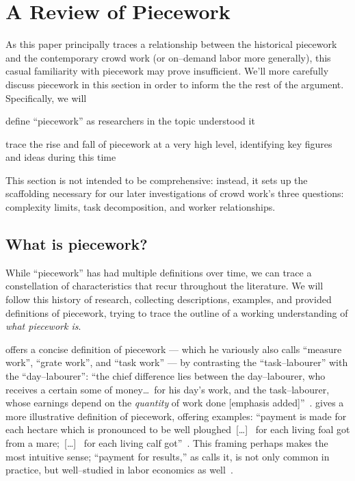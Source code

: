 \documentclass[trackingWork]{subfiles}
\begin{document}
\onlyinsubfile{\clearpage}
\section{A Review of Piecework}

As this paper principally traces a relationship between
the historical piecework and the contemporary crowd work
(or on--demand labor more generally),
this casual familiarity with piecework may prove insufficient.
We'll more carefully discuss piecework in this section in order
to inform the the rest of the argument.
Specifically, we will
\begin{inlinelist}[itemjoin*={;~and~},itemjoin={;~}]
  \item define ``piecework'' as researchers in the topic understood it
  \item trace the rise and fall of piecework at a very high level,
        identifying key figures and ideas during this time
\end{inlinelist}
This section is not intended to be comprehensive: instead, it sets up the scaffolding necessary for our later investigations of crowd work's three questions: complexity limits, task decomposition, and worker relationships.

\subsection{What is piecework?}
While ``piecework'' has had multiple definitions over time,
we can trace a constellation of characteristics that recur throughout the literature.
We will follow this history of research, collecting
descriptions,
examples, and
provided definitions of piecework, trying
to trace the outline of a working understanding of
\textit{what piecework is}.

\citeauthor{hughRaynbirdTaskWork} offers
a concise definition of piecework
--- which he variously also calls ``measure work'', ``grate work'', and ``task work'' ---
by contrasting the ``task--labourer'' with the ``day--labourer'':
``the chief difference lies between the day--labourer,
who receives a certain some of money\dots~for his day's work,
and the task--labourer, whose earnings depend on the \textit{quantity} of work done [emphasis added]''~\cite{hughRaynbirdTaskWork}.
\citeauthor{10.2307/2338394} gives a more illustrative definition of piecework,
offering examples:
``payment is made for each hectare which is pronounced to be well ploughed~[\dots]~
for each living foal got from a mare;~[\dots]~
for each living calf got''~\cite{10.2307/2338394}.
This framing perhaps makes the most intuitive sense;
``payment for results,'' as \citeauthor{10.2307/2338394} calls it,
is not only common in practice, but well--studied in labor economics as well~\cite{Figlio2007901,weitzman1976new,10.2307/3003414,BJIR:BJIR038}.
\end{document}
